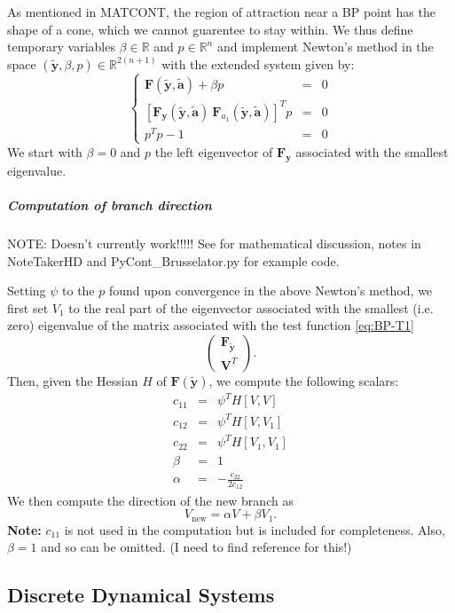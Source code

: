 \documentclass{article}[12pt]
\def\bF{\bm{F}}
\def\bV{\bm{V}}
\def\by{\bm{y}}
\def\bty{\bm{\tilde{y}}}
\def\bta{\bm{\tilde{a}}}
\begin{document}
As mentioned in MATCONT, the region of attraction near a BP point has the shape of a cone, which we cannot guarentee to stay within.  We thus define temporary variables $\beta\in\mathbb{R}$ and $p\in\mathbb{R}^{n}$ and implement Newton's method in the space $(\bty,\beta,p)\in\mathbb{R}^{2(n+1)}$ with the extended system given by:
\begin{equation}
\left\{\begin{array}{rcc}
\bF(\bty,\bta) + \beta p & = & 0 \\
\left[\bF_{\by}(\bty,\bta) \ \bF_{a_{1}}(\bty,\bta)\right]^{T}p & = & 0 \\
p^{T}p - 1 & = & 0
\end{array}\right.
\end{equation}
We start with $\beta=0$ and $p$ the left eigenvector of $\bF_{\by}$ associated with the smallest eigenvalue.

\subparagraph{Computation of branch direction}

NOTE: Doesn't currently work!!!!!  See \cite{Beyn_numericalcontinuation} for mathematical discussion, notes in NoteTakerHD and PyCont\_Brusselator.py for example code.

Setting $\psi$ to the $p$ found upon convergence in the above Newton's method, we first set $V_{1}$ to the real part of the eigenvector associated with the smallest (i.e. zero) eigenvalue of the matrix associated with the test function \eqref{eq:BP-T1}
\[
\left(\begin{array}{c} \bF_{\bty} \\ \bV^{T} \end{array}\right).
\]
Then, given the Hessian $H$ of $\bF(\bty)$, we compute the following scalars:
\begin{eqnarray*}
c_{11} & = & \psi^{T}H[V,V] \\
c_{12} & = & \psi^{T}H[V,V_{1}] \\
c_{22} & = & \psi^{T}H[V_{1},V_{1}] \\
\beta & = & 1 \\
\alpha & = & -\frac{c_{22}}{2c_{12}} 
\end{eqnarray*}
We then compute the direction of the new branch as
\[
V_{\mathrm{new}} = \alpha V + \beta V_{1}.
\]
{\bf Note:} $c_{11}$ is not used in the computation but is included for completeness.  Also, $\beta = 1$ and so can be omitted.  (I need to find reference for this!)

\subsection{Discrete Dynamical Systems}
\end{document}
